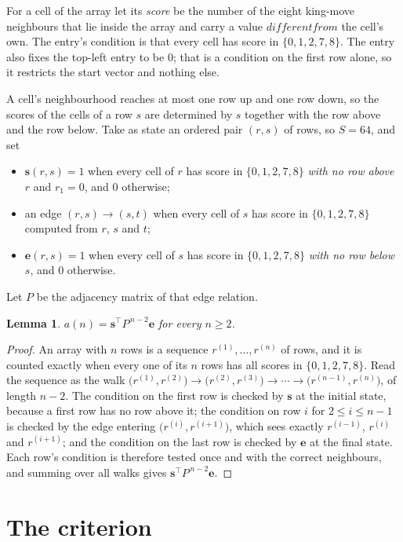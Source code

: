 \documentclass[11pt,a4paper]{article}
\theoremstyle{plain}
\newtheorem{lemma}[theorem]{Lemma}
\theoremstyle{definition}
\begin{document}
For a cell of the array let its \emph{score} be the number of the eight king-move neighbours that lie inside
the array and carry a value $different from$ the cell's own. The entry's condition is that every cell
has score in $\{0,1,2,7,8\}$. The entry also fixes the top-left entry to be $0$; that is a condition on the first row alone, so it restricts the start vector and nothing else.

A cell's neighbourhood reaches at most one row up and one row down, so the scores of the
cells of a row $s$ are determined by $s$ together with the row above and the row below.
Take as state an ordered pair $(r,s)$ of rows, so $S=64$, and set
\begin{itemize}
\item $\mathbf{s}(r,s)=1$ when every cell of $r$ has score in $\{0,1,2,7,8\}$ \emph{with no row
above $r$} and $r_1=0$, and $0$ otherwise;
\item an edge $(r,s)\to(s,t)$ when every cell of $s$ has score in $\{0,1,2,7,8\}$ computed from
$r$, $s$ and $t$;
\item $\mathbf{e}(r,s)=1$ when every cell of $s$ has score in $\{0,1,2,7,8\}$ \emph{with no row
below $s$}, and $0$ otherwise.
\end{itemize}
Let $P$ be the adjacency matrix of that edge relation.

\begin{lemma}\label{lem:walk}
$a(n)=\mathbf{s}^{\!\top}P^{\,n-2}\mathbf{e}$ for every $n\ge2$.
\end{lemma}

\begin{proof}
An array with $n$ rows is a sequence $r^{(1)},\dots,r^{(n)}$ of rows, and it is counted
exactly when every one of its $n$ rows has all scores in $\{0,1,2,7,8\}$. Read the sequence as the
walk $\bigl(r^{(1)},r^{(2)}\bigr)\to\bigl(r^{(2)},r^{(3)}\bigr)\to\cdots\to
\bigl(r^{(n-1)},r^{(n)}\bigr)$, of length $n-2$. The condition on the first row is
checked by $\mathbf{s}$ at the initial state, because a first row has no row above it; the
condition on row $i$ for $2\le i\le n-1$ is checked by the edge entering
$\bigl(r^{(i)},r^{(i+1)}\bigr)$, which sees exactly $r^{(i-1)}$, $r^{(i)}$ and
$r^{(i+1)}$; and the condition on the last row is checked by $\mathbf{e}$ at the final
state. Each row's condition is therefore tested once and with the correct neighbours, and
summing over all walks gives $\mathbf{s}^{\!\top}P^{\,n-2}\mathbf{e}$.
\end{proof}

\section{The criterion}
\end{document}
